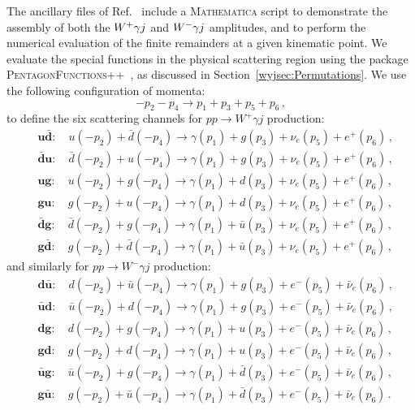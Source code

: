 \documentclass[main.tex]{subfiles}
\begin{document}
The ancillary files of Ref.~\cite{Badger:2022ncb} include a \textsc{Mathematica} script to demonstrate the assembly of both the $W^+\gamma j$ and $W^-\gamma j$ amplitudes, and to perform the numerical evaluation of the finite remainders at a given kinematic point. We evaluate the special functions in the physical scattering region using the package \textsc{PentagonFunctions++}~\cite{Chicherin:2021dyp}, as discussed in Section~\ref{wyjsec:Permutations}. We use the following configuration of momenta:
\begin{equation}
-p_2 - p_4 \to p_1 + p_3 + p_5 + p_6 \,,
\label{Wyjeq:momconfig}
\end{equation}
to define the six scattering channels for $pp\to W^+\gamma j$ production:
\begin{equation}
\label{Wyjeq:wplus_channel_definition}
\begin{aligned}
&\mathbf{u\bar{d}}: \quad  u(-p_2) + \bar{d}(-p_4) \to \gamma(p_1) + g(p_3) + \nu_e(p_5) + e^+(p_6) \,, \\
&\mathbf{\bar{d}u}: \quad  \bar{d}(-p_2) + u(-p_4) \to \gamma(p_1) + g(p_3) + \nu_e(p_5) + e^+(p_6) \,, \\
&\mathbf{ug}:       \quad  u(-p_2) + g(-p_4)       \to \gamma(p_1) + d(p_3) + \nu_e(p_5) + e^+(p_6) \,, \\
&\mathbf{gu}:       \quad  g(-p_2) + u(-p_4)       \to \gamma(p_1) + d(p_3) + \nu_e(p_5) + e^+(p_6) \,, \\
&\mathbf{\bar{d}g}: \quad  \bar{d}(-p_2) + g(-p_4) \to \gamma(p_1) + \bar{u}(p_3) + \nu_e(p_5) + e^+(p_6) \,, \\
&\mathbf{g\bar{d}}: \quad  g(-p_2) + \bar{d}(-p_4) \to \gamma(p_1) + \bar{u}(p_3) + \nu_e(p_5) + e^+(p_6) \,,
\end{aligned}
\end{equation}
and similarly for $pp\to W^-\gamma j$ production:
\begin{equation}
\label{Wyjeq:wmin_channel_definition}
\begin{aligned}
&\mathbf{d\bar{u}}: \quad  d(-p_2) + \bar{u}(-p_4) \to \gamma(p_1) + g(p_3)       + e^-(p_5) + \bar\nu_e(p_6) \,, \\
&\mathbf{\bar{u}d}: \quad  \bar{u}(-p_2) + d(-p_4) \to \gamma(p_1) + g(p_3)       + e^-(p_5) + \bar\nu_e(p_6) \,, \\
&\mathbf{dg}:       \quad  d(-p_2) + g(-p_4)       \to \gamma(p_1) + u(p_3)       + e^-(p_5) + \bar\nu_e(p_6) \,, \\
&\mathbf{gd}:       \quad  g(-p_2) + d(-p_4)       \to \gamma(p_1) + u(p_3)       + e^-(p_5) + \bar\nu_e(p_6) \,, \\
&\mathbf{\bar{u}g}: \quad  \bar{u}(-p_2) + g(-p_4) \to \gamma(p_1) + \bar{d}(p_3) + e^-(p_5) + \bar\nu_e(p_6) \,, \\
&\mathbf{g\bar{u}}: \quad  g(-p_2) + \bar{u}(-p_4) \to \gamma(p_1) + \bar{d}(p_3) + e^-(p_5) + \bar\nu_e(p_6) \,.
\end{aligned}
\end{equation}
\end{document}
